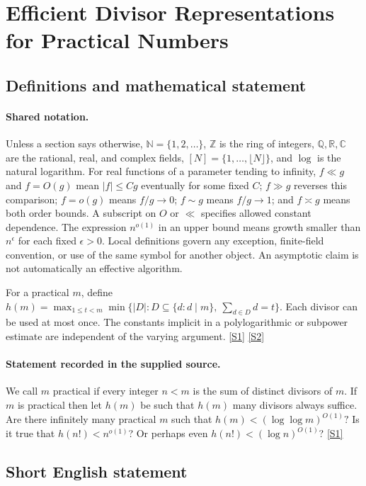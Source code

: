 \documentclass[11pt,a4paper]{article}
\newcommand{\N}{\mathbb{N}}
\newcommand{\Z}{\mathbb{Z}}
\newcommand{\Q}{\mathbb{Q}}
\newcommand{\R}{\mathbb{R}}
\newcommand{\C}{\mathbb{C}}
\newcommand{\sref}[2]{\hyperlink{source:#1:#2}{[S#2]}}
\begin{document}
\section{Efficient Divisor Representations for Practical Numbers}\label{statement}


\subsection{Definitions and mathematical statement}

\paragraph{Shared notation.}Unless a section says otherwise, $\N=\{1,2,\ldots\}$,
$\Z$ is the ring of integers, $\Q,\R,\C$ are the rational, real, and complex
fields, $[N]=\{1,\ldots,\lfloor N\rfloor\}$, and $\log$ is the natural
logarithm. For real functions of a parameter tending to infinity,
$f\ll g$ and $f=O(g)$ mean $|f|\leq Cg$ eventually for some fixed $C$;
$f\gg g$ reverses this comparison; $f=o(g)$ means $f/g\to0$;
$f\sim g$ means $f/g\to1$; and $f\asymp g$ means both order bounds.
A subscript on $O$ or $\ll$ specifies allowed constant dependence.
The expression $n^{o(1)}$ in an upper bound means growth smaller than
$n^\epsilon$ for each fixed $\epsilon>0$. Local definitions govern any
exception, finite-field convention, or use of the same symbol for another
object. An asymptotic claim is not automatically an effective algorithm.



For a practical $m$, define $h(m)=\max_{1\leq t<m}\min\{|D|:D\subseteq\{d:d\mid m\},\ \sum_{d\in D}d=t\}$. Each divisor can be used at most once. The constants implicit in a polylogarithmic or subpower estimate are independent of the varying argument. \sref{statement}{1} \sref{statement}{2}

\paragraph{Statement recorded in the supplied source.}
We call $m$ practical if every integer $n<m$ is the sum of distinct divisors of $m$. If $m$ is practical then let $h(m)$ be such that $h(m)$ many divisors always suffice.
Are there infinitely many practical $m$ such that $ h(m) < (\log\log m)^{O(1)}? $ Is it true that $h(n!)<n^{o(1)}$? Or perhaps even $h(n!)<(\log n)^{O(1)}$? \sref{statement}{1}

\subsection{Short English statement}
\end{document}
